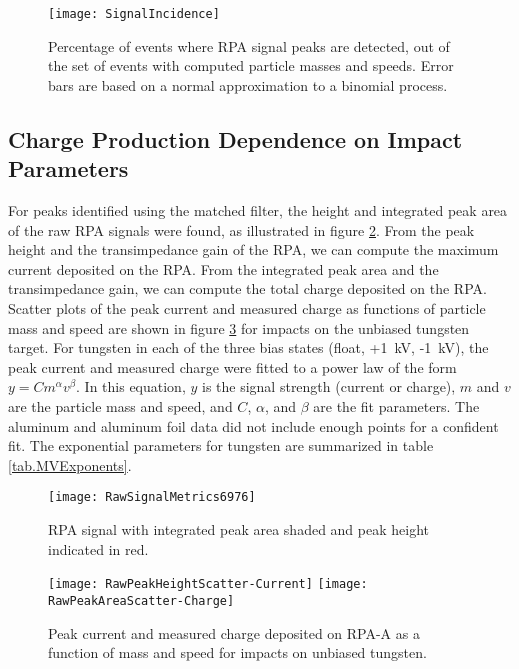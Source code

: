 \begin{figure}[\floatplace]
\begin{center}
\texttt{[image: SignalIncidence]}
\end{center}
\caption{\label{fig.SignalIncidence} Percentage of events where RPA signal peaks are detected, out of the set of events with computed particle masses and speeds.  Error bars are based on a normal approximation to a binomial process.}
\end{figure}

\subsection{Charge Production Dependence on Impact Parameters}
For peaks identified using the matched filter, the height and integrated peak area of the raw RPA signals were found, as illustrated in figure \ref{fig.RawSignalMetrics6976}.  From the peak height and the transimpedance gain of the RPA, we can compute the maximum current deposited on the RPA.  From the integrated peak area and the transimpedance gain, we can compute the total charge deposited on the RPA.  Scatter plots of the peak current and measured charge as functions of particle mass and speed are shown in figure \ref{fig.RawSignalScatter} for impacts on the unbiased tungsten target.  For tungsten in each of the three bias states (float, +1~kV, -1~kV), the peak current and measured charge were fitted to a power law of the form $y = Cm^\alpha v^\beta$.  In this equation, $y$ is the signal strength (current or charge), $m$ and $v$ are the particle mass and speed, and $C$, $\alpha$, and $\beta$ are the fit parameters.  The aluminum and aluminum foil data did not include enough points for a confident fit.  The exponential parameters for tungsten are summarized in table \ref{tab.MVExponents}.

\begin{figure}[\floatplace]
\begin{center}
\texttt{[image: RawSignalMetrics6976]}
\end{center}
\caption{\label{fig.RawSignalMetrics6976} RPA signal with integrated peak area shaded and peak height indicated in red.}
\end{figure}

\begin{figure}[\floatplace]
\begin{center}
\texttt{[image: RawPeakHeightScatter-Current]}
\texttt{[image: RawPeakAreaScatter-Charge]}
\end{center}
\caption{\label{fig.RawSignalScatter} Peak current and measured charge deposited on RPA-A as a function of mass and speed for impacts on unbiased tungsten.}
\end{figure}

